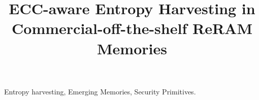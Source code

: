 \documentclass[conference]{IEEEtran}
\begin{document}
\title{ECC-aware Entropy Harvesting in Commercial-off-the-shelf ReRAM Memories}


\maketitle

\setlength{\textfloatsep}{5pt}
\setlength{\floatsep}{5pt}



\begin{IEEEkeywords}
Entropy harvesting, Emerging Memories, Security Primitives.
\end{IEEEkeywords}









\clearpage


\end{document}
